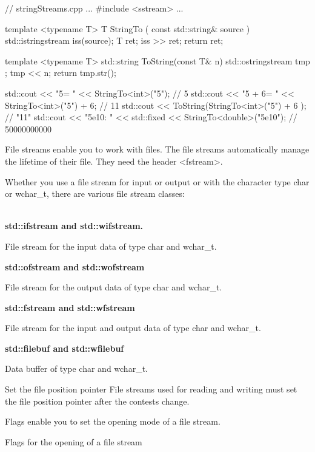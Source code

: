 
\begin{cpp}
// stringStreams.cpp
...
#include <sstream>
...

template <typename T>
T StringTo ( const std::string& source ){
	std::istringstream iss(source);
	T ret;
	iss >> ret;
	return ret;
}

template <typename T>
std::string ToString(const T& n){
	std::ostringstream tmp ;
	tmp << n;
	return tmp.str();
}

std::cout << "5= " << StringTo<int>("5"); // 5
std::cout << "5 + 6= " << StringTo<int>("5") + 6; // 11
std::cout << ToString(StringTo<int>("5") + 6 ); // "11"
std::cout << "5e10: " << std::fixed << StringTo<double>("5e10"); // 50000000000
\end{cpp}


File streams enable you to work with files. The file streams automatically manage the lifetime of their file. They need the header <fstream>.

Whether you use a file stream for input or output or with the character type char or wchar\_t, there are various file stream classes:

\noindent
\\\textbf{std::ifstream and std::wifstream.}

File stream for the input data of type char and wchar\_t.

\noindent
\textbf{std::ofstream and std::wofstream}

File stream for the output data of type char and wchar\_t.

\noindent
\textbf{std::fstream and std::wfstream}

File stream for the input and output data of type char and wchar\_t.

\noindent
\textbf{std::filebuf and std::wfilebuf}

Data buffer of type char and wchar\_t.\\

\begin{myWarning}{Set the file position pointer}
File streams used for reading and writing must set the file position pointer after the contests change.
\end{myWarning}

Flags enable you to set the opening mode of a file stream.

\begin{center}
Flags for the opening of a file stream
\end{center}

